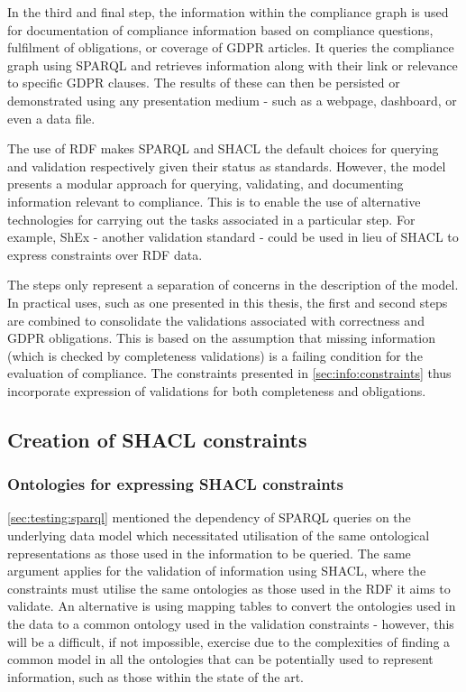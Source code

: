 In the third and final step, the information within the compliance graph is used for documentation of compliance information based on compliance questions, fulfilment of obligations, or coverage of GDPR articles. It queries the compliance graph using SPARQL and retrieves information along with their link or relevance to specific GDPR clauses.
The results of these can then be persisted or demonstrated using any presentation medium - such as a webpage, dashboard, or even a data file.

The use of RDF makes SPARQL and SHACL the default choices for querying and validation respectively given their status as standards.
However, the model presents a modular approach for querying, validating, and documenting information relevant to compliance. This is to enable the use of alternative technologies for carrying out the tasks associated in a particular step. 
For example, ShEx - another validation standard - could be used in lieu of SHACL to express constraints over RDF data.

The steps only represent a separation of concerns in the description of the model.
In practical uses, such as one presented in this thesis, the first and second steps are combined to consolidate the validations associated with correctness and GDPR obligations.
This is based on the assumption that missing information (which is checked by completeness validations) is a failing condition for the evaluation of compliance.
The constraints presented in \autoref{sec:info:constraints} thus incorporate expression of validations for both completeness and obligations.

\subsection{Creation of SHACL constraints}\label{sec:testing:shacl:constraints}
\subsubsection{Ontologies for expressing SHACL constraints}
\autoref{sec:testing:sparql} mentioned the dependency of SPARQL queries on the underlying data model which necessitated utilisation of the same ontological representations as those used in the information to be queried.
The same argument applies for the validation of information using SHACL, where the constraints must utilise the same ontologies as those used in the RDF it aims to validate.
An alternative is using mapping tables to convert the ontologies used in the data to a common ontology used in the validation constraints - however, this will be a difficult, if not impossible, exercise due to the complexities of finding a common model in all the ontologies that can be potentially used to represent information, such as those within the state of the art.

